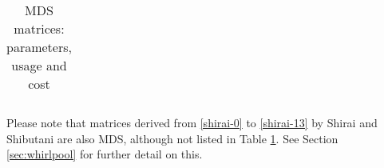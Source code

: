 \begin{footnotesize}
\begin{longtable}[c]{|l|l|l|l|l|l|l|l|l|l|}
\caption{MDS matrices: parameters, usage and cost}\label{tbl:mds-list}
\end{longtable}
\end{footnotesize}

Please note that matrices derived from \eqref{shirai-0} to \eqref{shirai-13} by Shirai and Shibutani are also MDS, although not listed in Table \ref{tbl:mds-list}. See Section \ref{sec:whirlpool} for further detail on this.
